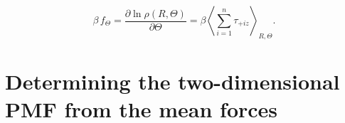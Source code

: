 \documentclass{article}
\begin{document}
%
%
$$
\beta \, f_{\Theta}
=
\frac{ \partial \ln \rho(R, \Theta) }
     { \partial \Theta }
=
\beta
\left\langle
  \sum_{i = 1}^n \tau_{+iz}
\right\rangle_{R, \Theta}
.
$$



\section{Determining the two-dimensional PMF from the mean forces}
\end{document}
